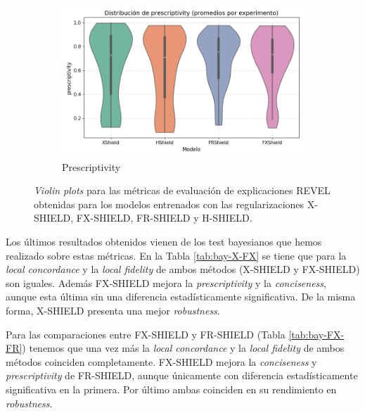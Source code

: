 \begin{figure}[H]
    \begin{subfigure}[b]{0.45\textwidth}
        \includegraphics[width=\linewidth]{images/boxplot_prescriptivity.png}
        \caption{Prescriptivity}
    \end{subfigure}
    \hfill
    \begin{subfigure}[b]{0.45\textwidth}
        \vspace{0.01\textheight} %
    \end{subfigure}

    \caption{\textit{Violin plots} para las métricas de evaluación de explicaciones REVEL obtenidas para los modelos entrenados con las regularizaciones X-SHIELD, FX-SHIELD, FR-SHIELD y H-SHIELD.}
    \label{fig:violinplots}
\end{figure}

Los últimos resultados obtenidos vienen de los test bayesianos que hemos realizado sobre estas métricas. En la Tabla \ref{tab:bay-X-FX} se tiene que para la \textit{local concordance} y la \textit{local fidelity} de ambos métodos (X-SHIELD y FX-SHIELD) son iguales. Además FX-SHIELD mejora la \textit{prescriptivity} y la \textit{conciseness}, aunque esta última sin una diferencia estadísticamente significativa. De la misma forma, X-SHIELD presenta una mejor \textit{robustness}.

Para las comparaciones entre FX-SHIELD y FR-SHIELD (Tabla \ref{tab:bay-FX-FR}) tenemos que una vez más la \textit{local concordance} y la \textit{local fidelity} de ambos métodos coinciden completamente. FX-SHIELD mejora la \textit{conciseness} y \textit{prescriptivity} de FR-SHIELD, aunque únicamente con diferencia estadísticamente significativa en la primera. Por último ambas coinciden en su rendimiento en \textit{robustness}.

